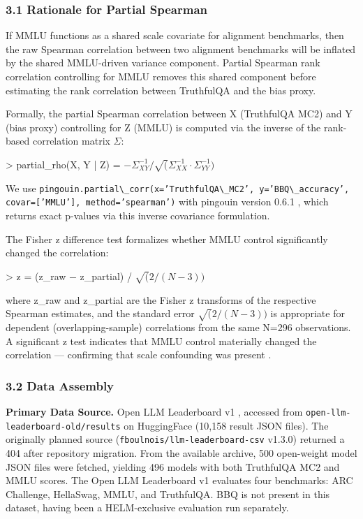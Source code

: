 
\subsubsection{3.1 Rationale for Partial Spearman}

If MMLU functions as a shared scale covariate for alignment benchmarks, then the raw Spearman correlation between two alignment benchmarks will be inflated by the shared MMLU-driven variance component. Partial Spearman rank correlation controlling for MMLU removes this shared component before estimating the rank correlation between TruthfulQA and the bias proxy.

Formally, the partial Spearman correlation between X (TruthfulQA MC2) and Y (bias proxy) controlling for Z (MMLU) is computed via the inverse of the rank-based correlation matrix $\Sigma$:

> partial\_rho(X, Y | Z) = $-\Sigma ^{-1}_{XY} / \sqrt(\Sigma ^{-1}_{XX} \cdot \Sigma ^{-1}_{YY})$

We use \texttt{pingouin.partial\textbackslash \_corr(x='TruthfulQA\textbackslash \_MC2', y='BBQ\textbackslash \_accuracy', covar=['MMLU'], method='spearman')} with pingouin version 0.6.1 \citep{Vallat2018Pingouin}, which returns exact p-values via this inverse covariance formulation.

The Fisher z difference test formalizes whether MMLU control significantly changed the correlation:

> z = (z\_raw $-$ z\_partial) / $\sqrt(2/(N-3))$

where z\_raw and z\_partial are the Fisher z transforms of the respective Spearman estimates, and the standard error $\sqrt(2/(N-3))$ is appropriate for dependent (overlapping-sample) correlations from the same N=296 observations. A significant z test indicates that MMLU control materially changed the correlation --- confirming that scale confounding was present \citep{Steiger1980}.

\subsubsection{3.2 Data Assembly}

\textbf{Primary Data Source.} Open LLM Leaderboard v1 \citep{Beeching2023}, accessed from \texttt{open-llm-leaderboard-old/results} on HuggingFace (10,158 result JSON files). The originally planned source (\texttt{fboulnois/llm-leaderboard-csv} v1.3.0) returned a 404 after repository migration. From the available archive, 500 open-weight model JSON files were fetched, yielding 496 models with both TruthfulQA MC2 and MMLU scores. The Open LLM Leaderboard v1 evaluates four benchmarks: ARC Challenge, HellaSwag, MMLU, and TruthfulQA. BBQ is not present in this dataset, having been a HELM-exclusive evaluation run separately.

